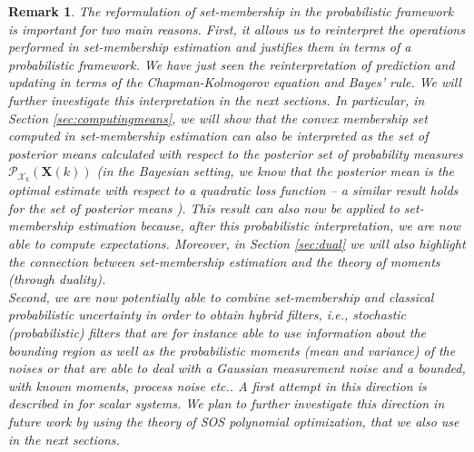 \documentclass[twocolumn]{autart}
\newtheorem{remark}{Remark}{\normalfont}{\normalfont}
\newcommand{\DP}[1]{{#1}}
\begin{document}
 \begin{remark}
 The reformulation of set-membership in the probabilistic framework  is important for two main reasons.
First, it allows us to reinterpret  the operations performed in set-membership estimation and justifies them in terms
  of a probabilistic framework. We have just seen the reinterpretation of prediction and updating in terms of the Chapman-Kolmogorov
  equation and Bayes' rule. We will further investigate this interpretation in the next sections. In particular, in Section \ref{sec:computingmeans}, we will show that the convex membership set computed in set-membership estimation can also be interpreted   as the set of posterior means calculated \DP{with respect to}  the posterior set of probability measures $\mathcal{P}_{\mathcal{X}_k}(\mathbf{X}(k))$   (in the Bayesian setting, we know that the posterior mean is the optimal estimate \DP{with respect to}  a quadratic loss function -- a similar result holds  for the set of posterior means \cite[Sec.5]{benavoli2012g}). This result can also now be applied to set-membership estimation
  because, after this probabilistic interpretation, we are now able to compute expectations. Moreover, in Section \ref{sec:dual} we will also highlight the connection between set-membership
  estimation and the theory of moments (through duality).\\
  Second,  we are now potentially able to combine set-membership and classical probabilistic uncertainty in order to obtain hybrid filters, i.e., stochastic (probabilistic) filters that are for instance able to use information about the bounding region as well as the probabilistic moments (mean and variance) of the noises or that are able to deal with a Gaussian measurement noise and a bounded, with known moments, process noise etc.. A first attempt in this direction is described in \cite{benavoli2013b} for scalar systems. We plan to
  further investigate this direction in future work by using the theory of SOS polynomial optimization, that we also use in the next sections.
 \end{remark}
\end{document}
